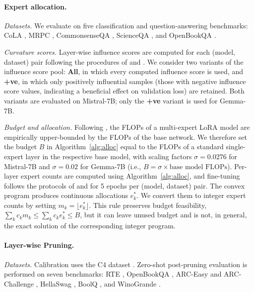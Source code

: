 \documentclass[accepted]{uai2026}%
\theoremstyle{remark}%
\begin{document}
\paragraph{Expert allocation.}
\textit{Datasets.}
We evaluate on five classification and question-answering benchmarks:
CoLA \citet{cola_dataset}, MRPC \citet{mrpc_dataset},
CommonsenseQA \citet{commonsenseqa}, ScienceQA \citet{scienceQ},
and OpenBookQA \citet{openbookQ}.

\textit{Curvature scores.}
Layer-wise influence scores are computed for each (model, dataset)
pair following the procedures of \citet{layerIF} and \citet{datainf}.
We consider two variants of the influence score pool:
\textbf{All}, in which every computed influence score is used,
and \textbf{+ve}, in which only positively influential samples
(those with negative influence score values, indicating a beneficial
effect on validation loss) are retained.
Both variants are evaluated on Mistral-7B; only the \textbf{+ve}
variant is used for Gemma-7B.

\textit{Budget and allocation.}
Following \citet{meo}, the FLOPs of a multi-expert LoRA model are
empirically upper-bounded by the FLOPs of the base network.
We therefore set the budget $B$ in Algorithm~\ref{alg:alloc} equal
to the FLOPs of a standard single-expert layer in the respective
base model, with scaling factors $\sigma = 0.0276$ for Mistral-7B
and $\sigma = 0.02$ for Gemma-7B (i.e., $B = \sigma \times
\text{base model FLOPs}$).
Per-layer expert counts are computed using Algorithm~\ref{alg:alloc},
and fine-tuning follows the protocols of \citet{alphalora} and
\citet{MolA} for 5 epochs per (model, dataset) pair.
The convex program produces continuous allocations $e_k^*$.
We convert them to integer expert counts by setting $m_k=\lfloor e_k^*\rfloor$.
This rule preserves budget feasibility,
$\sum_k c_k m_k\le\sum_k c_k e_k^*\le B$, but it can leave unused budget and
is not, in general, the exact solution of the corresponding integer program.

\paragraph{Layer-wise Pruning.}
\textit{Datasets.}
Calibration uses the C4 dataset \citet{c4_dataset}.
Zero-shot post-pruning evaluation is performed on seven benchmarks:
RTE \citet{rte_task}, OpenBookQA \citet{openbookQ},
ARC-Easy and ARC-Challenge \citet{ARCchallenge},
HellaSwag \citet{hellaswag}, BoolQ \citet{boolq},
and WinoGrande \citet{WinoGrande}.
\end{document}
